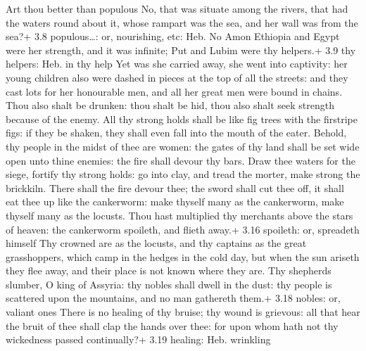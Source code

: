  Art thou better than populous No, that was situate among
the rivers, that had the waters round about it, whose rampart was the
sea, and her wall was from the sea?+ 3.8 populous\ldots: or, nourishing,
etc: Heb. No Amon  Ethiopia and Egypt were her strength, and
it was infinite; Put and Lubim were thy helpers.+ 3.9 thy helpers: Heb.
in thy help  Yet was she carried away, she went into
captivity: her young children also were dashed in pieces at the top of
all the streets: and they cast lots for her honourable men, and all her
great men were bound in chains.  Thou also shalt be
drunken: thou shalt be hid, thou also shalt seek strength because of the
enemy.  All thy strong holds shall be like fig trees with
the firstripe figs: if they be shaken, they shall even fall into the
mouth of the eater.  Behold, thy people in the midst of
thee are women: the gates of thy land shall be set wide open unto thine
enemies: the fire shall devour thy bars.  Draw thee waters
for the siege, fortify thy strong holds: go into clay, and tread the
morter, make strong the brickkiln.  There shall the fire
devour thee; the sword shall cut thee off, it shall eat thee up like the
cankerworm: make thyself many as the cankerworm, make thyself many as
the locusts.  Thou hast multiplied thy merchants above the
stars of heaven: the cankerworm spoileth, and flieth away.+ 3.16
spoileth: or, spreadeth himself  Thy crowned are as the
locusts, and thy captains as the great grasshoppers, which camp in the
hedges in the cold day, but when the sun ariseth they flee away, and
their place is not known where they are.  Thy shepherds
slumber, O king of Assyria: thy nobles shall dwell in the dust: thy
people is scattered upon the mountains, and no man gathereth them.+ 3.18
nobles: or, valiant ones  There is no healing of thy
bruise; thy wound is grievous: all that hear the bruit of thee shall
clap the hands over thee: for upon whom hath not thy wickedness passed
continually?+ 3.19 healing: Heb. wrinkling
